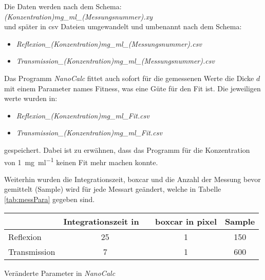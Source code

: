 Die Daten werden nach dem Schema:\\
\textit{(Konzentration)mg\_ml\_(Messungsnummer).xy}\\
und später in csv Dateien umgewandelt und umbenannt nach dem Schema:
\begin{itemize}
	\item \textit{Reflexion\_(Konzentration)mg\_ml\_(Messungsnummer).csv}
	\item \textit{Transmission\_(Konzentration)mg\_ml\_(Messungsnummer).csv}
\end{itemize}

Das Programm \textit{NanoCalc} fittet auch sofort für die gemessenen Werte die Dicke $d$ mit einem Parameter names Fitness, was eine Güte für den Fit ist. Die jeweiligen werte wurden in:
\begin{itemize}
	\item \textit{Reflexion\_(Konzentration)mg\_ml\_Fit.csv}
	\item \textit{Transmission\_(Konzentration)mg\_ml\_Fit.csv}
\end{itemize}
gespeichert. Dabei ist zu erwähnen, dass das Programm für die Konzentration von \SI{1}{\milli\gram\per\milli\litre} keinen Fit mehr machen konnte. \bigskip

Weiterhin wurden die Integrationszeit, boxcar und die Anzahl der Messung bevor gemittelt (Sample) wird für jede Messart geändert, welche in Tabelle \ref{tab:messPara} gegeben sind.
\begin{center}
	\captionsetup{type=table}
	\begin{tabular}{l | c c c}
		             & Integrationszeit in \si{\milli\sec} & boxcar in pixel & Sample \\
		\hline
		Reflexion    & 25								   & 1				 & 150    \\
		Transmission & 7								   & 1 				 & 600    
	\end{tabular}
	\caption{Veränderte Parameter in \textit{NanoCalc}}
	\label{tab:messPara}
\end{center} 